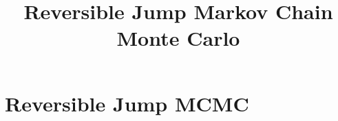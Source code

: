 \documentclass[12pt]{article}
\begin{document}
\title{Reversible Jump Markov Chain Monte Carlo}

\section{Reversible Jump MCMC}
\end{document}
